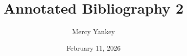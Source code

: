 \documentclass[12pt]{article}
\title{\textbf{Annotated Bibliography 2}}
\author{Mercy Yankey}
\date{February 11, 2026}
\begin{document}
\maketitle

\nocite{montrul2008gender}
\nocite{levy2009technology}
\nocite{montrul2016heritage}
\nocite{muckenhumer2023efficacy}
\nocite{almahmoud2015native}
\nocite{papadopoulos2013aladdin}
\nocite{hoff2018bilingual}
\nocite{hoff2013language_trajectories}
\nocite{gharibi2017factors}
\nocite{montrul2010challenges}
\nocite{multigen2024speech}
\nocite{byrnes2005heritage}



\end{document}
